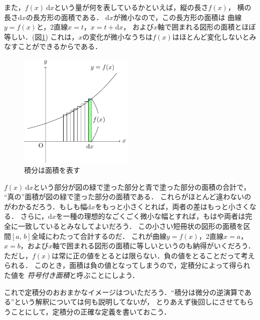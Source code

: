 また，$f(x) \: \mathrm{d}x$という量が何を表しているかといえば，縦の長さ$f(x)$，
横の長さ$\mathrm{d}x$の長方形の面積である．
$\mathrm{d}x$が微小なので，この長方形の面積は
曲線$y=f(x)$と，2直線$x=t$，$x=t+\mathrm{d}x$，
および$x$軸で囲まれる図形の面積とほぼ等しい．(図\ref{fig:sekibunmenseki})
これは，$x$の変化が微小なうちは$f(x)$はほとんど変化しないとみなすことができるからである．
\begin{figure}[h]
 \centering
 \includegraphics[width=5.5cm]{picture/sekibun1.pdf}
 \caption{積分は面積を表す}
  \label{fig:sekibunmenseki}
\end{figure}

$f(x) \: \mathrm{d}x$という部分が図の緑で塗った部分と青で塗った部分の面積の合計で，
``真の''面積が図の緑で塗った部分の面積である．
これらがほとんど違わないのがわかるだろう．もしも幅$\mathrm{d}x$をもっと小さくとれば，両者の差はもっと小さくなる． 
さらに，$\mathrm{d}x$を一種の理想的なごくごく微小な幅とすれば，もはや両者は完全に一致しているとみなしてよいだろう．
この小さい短冊状の図形の面積を区間$[a, \, b]$全域にわたって合計するのだ．
これが曲線$y=f(x)$，2直線$x=a$，$x=b$，および$x$軸で囲まれる図形の面積に等しいというのも納得がいくだろう．
ただし，$f(x)$は常に正の値をとるとは限らない．負の値をとることだって考えられる．
このとき，面積は負の値となってしまうので，定積分によって得られた値を
\emph{符号付き面積}と呼ぶことにしよう．

これで定積分のおおまかなイメージはついただろう．``積分は微分の逆演算である''という解釈については何も説明してないが，
とりあえず後回しにさせてもらうことにして，定積分の正確な定義を書いておこう．
